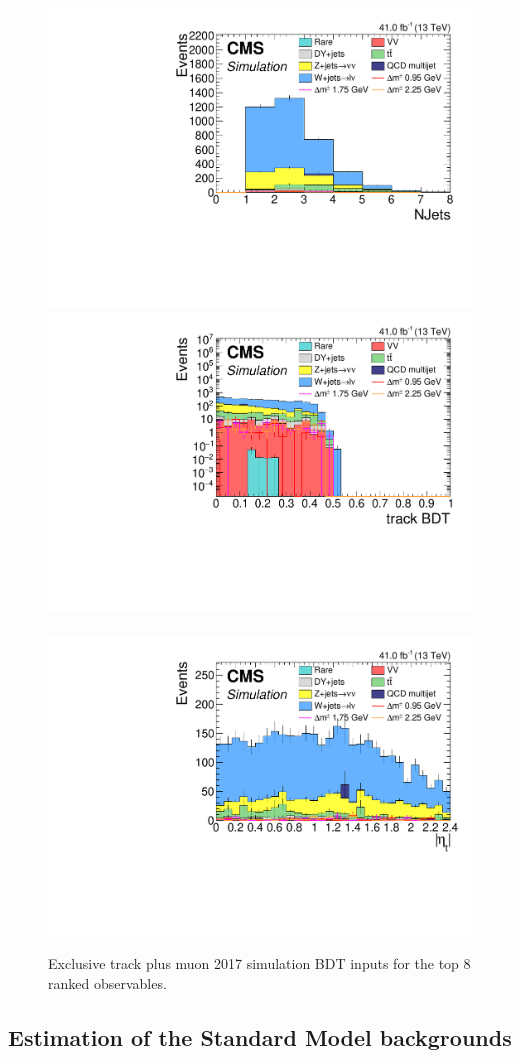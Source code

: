 \begin{figure}[!htb]
\includegraphics[width=0.48\linewidth]{plots/track_muon_bg_signal/none_NJets.pdf} \\
\includegraphics[width=0.48\linewidth]{plots/track_muon_bg_signal/none_trackBDTCorrJetNoMultIso10Dr0.6_log.pdf} \,
\includegraphics[width=0.48\linewidth]{plots/track_muon_bg_signal/none_abs(trackCorrJetNoMultIso10Dr0.6.Eta()).pdf} \\



\caption[Exclusive track plus muon simulation BDT inputs]{Exclusive track plus muon 2017 simulation BDT inputs for the top 8 ranked observables.}
\label{fig:exclusive-track-muon-bdt-sim-inputs}
\end{figure}


\clearpage
\subsection{Estimation of the Standard Model backgrounds}
\label{sec:background-estimation}

